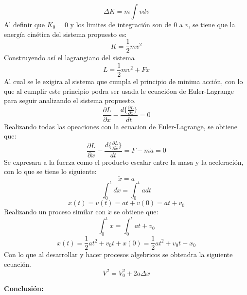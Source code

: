 \documentclass{article}
\begin{document}
\begin{multicols}{2}
\begin{equation}
\Delta K = m \int vdv
\end{equation}
Al definir que $K_0 = 0$ y los limites de integración son de $0$ a $v$, se tiene que la energía cinética del sistema propuesto es:
\begin{equation}
K = \frac{1}{2} m v^2
\end{equation}
Construyendo así el lagrangiano del sistema
\begin{equation}
L = \frac{1}{2} mv^2 + Fx
\end{equation}
Al cual se le exigira al sistema que cumpla el principio de minima acción, con lo que al cumplir este principio podra ser usada le ecuacióon de Euler-Lagrange para seguir analizando el sistema propuesto.
\begin{equation}
\frac{\partial L}{\partial x} - \frac{d\lbrace \frac{\partial L} {\partial \dot{x} } \rbrace}{dt} = 0
\end{equation}
Realizando todas las opeaciones con la ecuacion de Euler-Lagrange, se obtiene que:
\begin{equation}
\frac{\partial L}{\partial x} - \frac{d\lbrace \frac{\partial L} {\partial \dot{x} } \rbrace}{dt} =  F - m\ddot{a} = 0
\end{equation}
Se expresara a la fuerza como el producto escalar entre la masa y la aceleración, con lo que se tiene lo siguiente:
\begin{equation}
\ddot{x}=a
\end{equation}
\begin{equation}
\int_0^t d\dot{x}= \int_{0}^t adt
\end{equation}
\begin{equation}
\dot{x}(t) = v(t) = at + v(0) = at+ v_0
\end{equation}
Realizando un proceso similar con $\dot{x}$ se obtiene que:
\begin{equation}
\int_0^t x = \int_0^t at+v_0 
\end{equation}
\begin{equation}
x(t) = \frac{1}{2} at^2 +v_0 t +x (0) = \frac{1}{2} at^2 +v_0 t +x_0 
\end{equation}
Con lo que al desarrollar y hacer procesos algebricos se obtendra la siguiente ecuación.
\begin{equation}
V^2= V_0^2 + 2a \Delta x
\end{equation}
\vspace*{-0.5cm}
\begin{center}
\textbf{
Conclusión:
}
\end{center}

\end{multicols}
\end{document}

